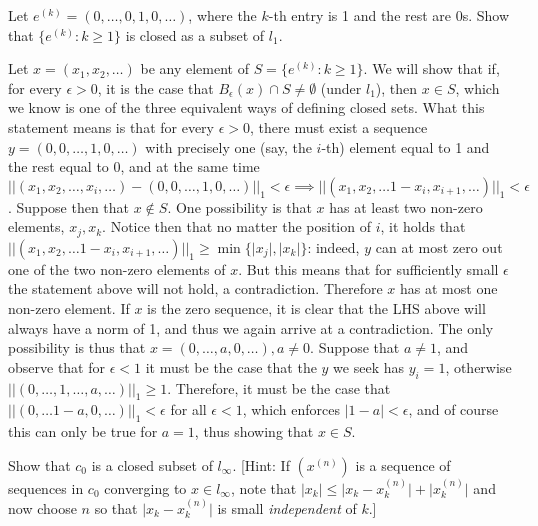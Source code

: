 \begin{exercise}{11}
    Let $e^{(k)} = (0, \ldots, 0, 1, 0, \ldots)$, where the $k$-th entry is 1 and the rest are 0s.
    Show that $\{e^{(k)}: k \geq 1\}$ is closed as a subset of $l_1$.
\end{exercise}

\begin{solution}
    
    Let $x = (x_1, x_2, \ldots)$ be any element of $S = \{e^{(k)}: k \geq 1\}$.
    We will show that if, for every $\epsilon > 0$, it is the case that $B_{\epsilon}(x) \cap S \neq \emptyset$ (under $l_1$), then $x \in S$, which we know is one of the three equivalent ways of defining closed sets.
    What this statement means is that for every $\epsilon > 0$, there must exist a sequence $y = (0, 0, \ldots, 1, 0, \ldots)$ with precisely one (say, the $i$-th) element equal to 1 and the rest equal to 0, and at the same time $\lvert \lvert (x_1, x_2, \ldots, x_i, \ldots) - (0, 0, \ldots, 1, 0, \ldots) \rvert \rvert_1 < \epsilon \implies \lvert \lvert (x_1, x_2, \ldots 1 - x_i, x_{i+1}, \ldots) \rvert \rvert_1 < \epsilon$.
    Suppose then that $x \notin S$.
    One possibility is that $x$ has at least two non-zero elements, $x_j, x_k$.
    Notice then that no matter the position of $i$, it holds that $\lvert \lvert (x_1, x_2, \ldots 1 - x_i, x_{i+1}, \ldots) \rvert \rvert_1 \geq \min\{\lvert x_j \rvert, \lvert x_k \rvert\}$: indeed, $y$ can at most zero out one of the two non-zero elements of $x$. 
    But this means that for sufficiently small $\epsilon$ the statement above will not hold, a contradiction.
    Therefore $x$ has at most one non-zero element.
    If $x$ is the zero sequence, it is clear that the LHS above will always have a norm of 1, and thus we again arrive at a contradiction.
    The only possibility is thus that $x = (0, \ldots, a, 0, \ldots), a \neq 0$.
    Suppose that $a \neq 1$, and observe that for $\epsilon < 1$ it must be the case that the $y$ we seek has $y_i = 1$, otherwise $\lvert \lvert (0, \ldots, 1, \ldots, a, \ldots) \rvert \rvert_1 \geq 1$.
    Therefore, it must be the case that $\lvert \lvert (0, \ldots 1 - a, 0, \ldots) \rvert \rvert_1 < \epsilon$ for all $\epsilon < 1$, which enforces $\lvert 1 -a \rvert < \epsilon$, and of course this can only be true for $a = 1$, thus showing that $x \in S$.
\end{solution}

\begin{exercise}{13}
    Show that $c_0$ is a closed subset of $l_{\infty}$.
    [Hint: If $(x^{(n)})$ is a sequence of sequences in $c_0$ converging to $x \in l_{\infty}$, note that $\lvert x_k \rvert \leq \lvert x_k - x_k^{(n)} \rvert + \lvert x_k^{(n)} \rvert$ and now choose $n$ so that $\lvert x_k - x_k^{(n)} \rvert$ is small \textit{independent} of $k$.]
\end{exercise}

